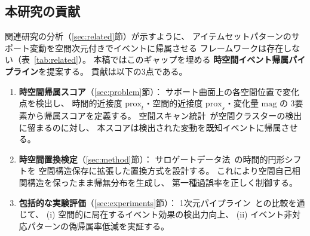 \subsection{本研究の貢献}

関連研究の分析（\ref{sec:related}節）が示すように、
アイテムセットパターンのサポート変動を空間次元付きでイベントに帰属させる
フレームワークは存在しない（表~\ref{tab:related}）。
本稿ではこのギャップを埋める
\textbf{時空間イベント帰属パイプライン}を提案する。
貢献は以下の3点である。

\begin{enumerate}
\item \textbf{時空間帰属スコア}（\ref{sec:problem}節）：
サポート曲面上の各空間位置で変化点を検出し、
時間的近接度 $\mathrm{prox}_t$・空間的近接度 $\mathrm{prox}_s$・変化量 $\mathrm{mag}$ の
3要素から帰属スコアを定義する。
空間スキャン統計~\cite{kulldorff1997spatial}が空間クラスターの検出に留まるのに対し、
本スコアは検出された変動を既知イベントに帰属させる。

\item \textbf{時空間置換検定}（\ref{sec:method}節）：
サロゲートデータ法~\cite{lancaster2018surrogate}の時間的円形シフトを
空間構造保存に拡張した置換方式を設計する。
これにより空間自己相関構造を保ったまま帰無分布を生成し、
第一種過誤率を正しく制御する。

\item \textbf{包括的な実験評価}（\ref{sec:experiments}節）：
1次元パイプライン~\cite{dsaa2025}との比較を通じて、
(i) 空間的に局在するイベント効果の検出力向上、
(ii) イベント非対応パターンの偽帰属率低減を実証する。
\end{enumerate}
